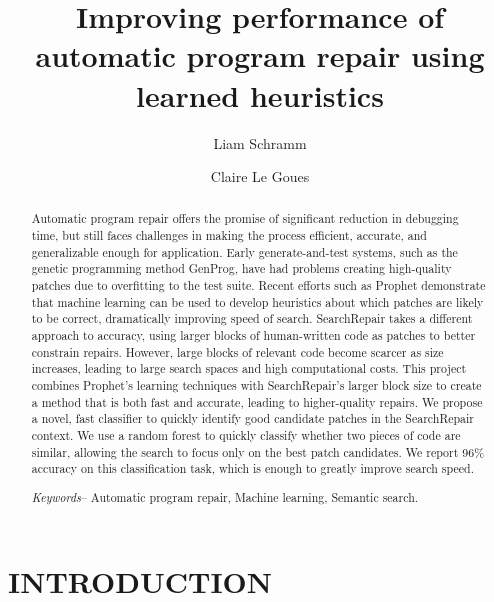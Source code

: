 \documentclass[conference]{IEEEtran}
\title{\LARGE \bf
Improving performance of automatic program repair using learned heuristics
}
\author{Liam Schramm}
\affil{Bard College}
\author{Claire Le Goues}
\affil{Carnegie Melon University}
\begin{document}
\maketitle
\thispagestyle{empty}
\pagestyle{empty}


\begin{abstract}

Automatic program repair offers the promise of significant reduction in debugging time, but still faces challenges in making the process efficient, accurate, and generalizable enough for application. 
Early generate-and-test systems, such as the genetic programming method GenProg, have had problems creating high-quality patches due to overfitting to the test suite. 
Recent efforts such as Prophet demonstrate that machine learning can be used to develop heuristics about which patches are likely to be correct, dramatically improving speed of search. SearchRepair takes a different approach to accuracy, using larger blocks of human-written code as patches to better constrain repairs. 
However, large blocks of relevant code become scarcer as size increases, leading to large search spaces and high computational costs. 
This project combines Prophet's learning techniques with SearchRepair's larger block size to create a method that is both fast and accurate, leading to higher-quality repairs. 
We propose a novel, fast classifier to quickly identify good candidate patches in the SearchRepair context. 
We use a random forest to quickly classify whether two pieces of code are similar, allowing the search to focus only on the best patch candidates. We report 96\% accuracy on this classification task, which is enough to greatly improve search speed.


\textit{Keywords}-- Automatic program repair, Machine learning, Semantic search.


\end{abstract}




\section{INTRODUCTION}
\end{document}

